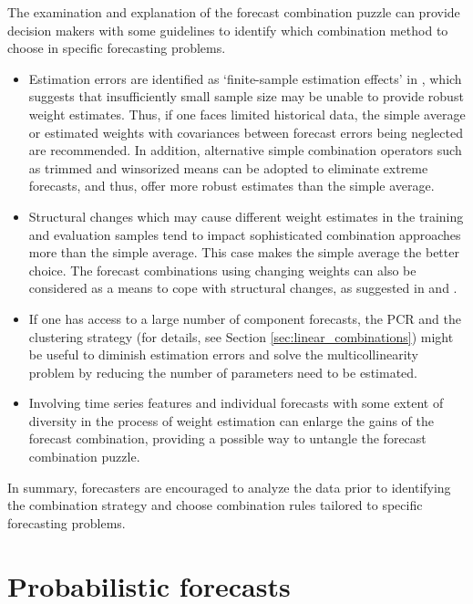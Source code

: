 \documentclass[11pt]{article}
\begin{document}
The examination and explanation of the forecast combination puzzle can provide decision makers with some guidelines to identify which combination method to choose in specific forecasting problems.
\begin{itemize}
  \item Estimation errors are identified as `finite-sample estimation effects' in \cite{Smith2009-wd}, which suggests that insufficiently small sample size may be unable to provide robust weight estimates. Thus, if one faces limited historical data, the simple average or estimated weights with covariances between forecast errors being neglected are recommended. In addition, alternative simple combination operators such as trimmed and winsorized means can be adopted to eliminate extreme forecasts, and thus, offer more robust estimates than the simple average.
  \item Structural changes which may cause different weight estimates in the training and evaluation samples tend to impact sophisticated combination approaches more than the simple average. This case makes the simple average the better choice. The forecast combinations using changing weights can also be considered as a means to cope with structural changes, as suggested in \cite{Diebold1987-go} and \cite{Deutsch1994-ob}.
  \item If one has access to a large number of component forecasts, the PCR and the clustering strategy (for details, see Section \ref{sec:linear_combinations}) might be useful to diminish estimation errors and solve the multicollinearity problem by reducing the number of parameters need to be estimated.
  \item Involving time series features and individual forecasts with some extent of diversity in the process of weight estimation can enlarge the gains of the forecast combination, providing a possible way to untangle the forecast combination puzzle.
\end{itemize}
In summary, forecasters are encouraged to analyze the data prior to identifying the combination strategy and choose combination rules tailored to specific forecasting problems.


\section{Probabilistic forecasts}
\label{sec:probabilistic_forecasts}
\end{document}
